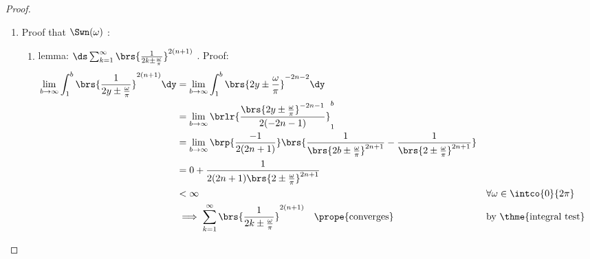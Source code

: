 \begin{proof}
\begin{enumerate}
\begin{enumerate}
      \item Proof that $\Swn(\omega)$ : \label{item:Nriesz_Gw_converges}
        \begin{enumerate}
          \item lemma: $\ds\sum_{k=1}^\infty \brs{\frac{1}{2k\pm\frac{\omega}{\pi}}}^{2(n+1)}$ . Proof: \label{ilem:Nriesz_Gw_converges_pm}
            \begin{align*}
              \lim_{b\to\infty}\int_1^b \brs{\frac{1}{2y\pm\frac{\omega}{\pi}}}^{2(n+1)} \dy
                &= \lim_{b\to\infty}\int_1^b \brs{2y\pm\frac{\omega}{\pi}}^{-2n-2} \dy
              \\&= \lim_{b\to\infty} \brlr{\frac{\brs{2y\pm\frac{\omega}{\pi}}^{-2n-1}}{2(-2n-1)}}_1^b
              \\&= \lim_{b\to\infty} \brp{\frac{-1}{2(2n+1)}}
                                     \brs{\frac{1}{\brs{2b\pm\frac{\omega}{\pi}}^{2n+1}}
                                         -\frac{1}{\brs{2 \pm\frac{\omega}{\pi}}^{2n+1}}
                                         }
              \\&= 0 + \frac{1}{2(2n+1)\brs{2 \pm\frac{\omega}{\pi}}^{2n+1}}
              \\&< \infty 
                && \forall \omega\in\intco{0}{2\pi}
              \\&\implies \sum_{k=1}^\infty \brs{\frac{1}{2k\pm\frac{\omega}{\pi}}}^{2(n+1)} \quad\text{\prope{converges}}
                && \text{by \thme{integral test}}
            \end{align*}


\end{enumerate}
\end{enumerate}
\end{enumerate}
\end{proof}
